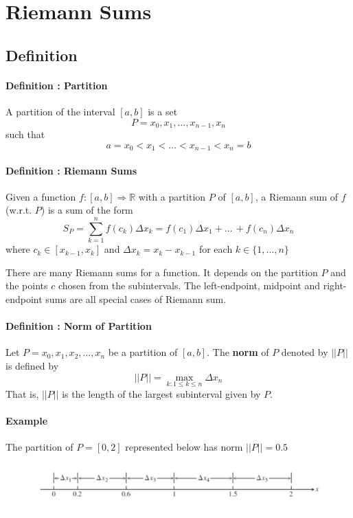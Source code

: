 \documentclass[12pt]{article}
\begin{document}
\section{Riemann Sums}
\subsection{Definition}
\paragraph{Definition : Partition}
A partition of the interval $[a, b]$ is a set
\[
    P = {x_0, x_1, \dots, x_{n - 1}, x_n}
\]
such that 
\[
    a = x_0 < x_1 < \dots < x_{n - 1} < x_n = b 
\]

\paragraph{Definition : Riemann Sums}
Given a function $f:[a,b] \Rightarrow \mathbb{R}$ with a partition $P$ of $[a, b]$, a Riemann sum of
$f$ (w.r.t. $P$) is a sum of the form
\[
    S_P = \sum_{k = 1}^n f(c_k) \Delta x_k = f(c_1) \Delta x_1 + \dots\, + f(c_n) \Delta x_n
\]
where $c_k \in [x_{k - 1}, x_k]$ and $\Delta x_k = x_k - x_{k - 1}$ for each $k \in \{1, ..., n\}$

There are many Riemann sums for a function. It depends on the partition $P$ and the points $c$ chosen from the subintervals.
The left-endpoint, midpoint and right-endpoint sums are all special cases of Riemann sum.

\paragraph{Definition : Norm of Partition} Let $P = {x_0, x_1, x_2, ..., x_n}$ be a partition of $[a, b]$. The \textbf{norm} of $P$ denoted by $||P||$ is defined by
\[
    || P || = \max_{k: 1 \leq k \leq n} \Delta x_n
\]
That is, $||P||$ is the length of the largest subinterval given by $P$.

\paragraph{Example}
The partition of $P = [0, 2]$ represented below has norm $||P|| = 0.5$
\begin{figure}[h!]
     \centering
     \includegraphics[width = 0.9\linewidth]{Images/norm.png}
\end{figure}
\end{document}
